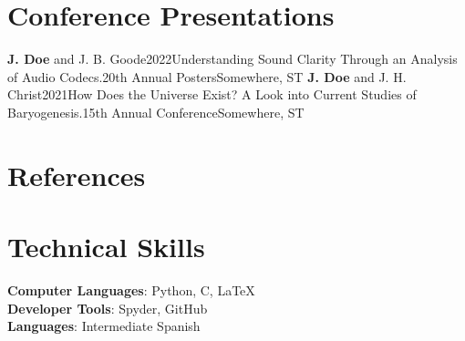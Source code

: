 \documentclass[letterpaper,11pt]{article}
\begin{document}

\section{Conference Presentations}
    \cvSubHeadingListStart
        \cvPosterItem
            {\textbf{J. Doe} and J. B. Goode}{2022}{Understanding Sound Clarity Through an Analysis of Audio Codecs.}{20th Annual Posters}{Somewhere, ST}
        \cvPosterItem
            {\textbf{J. Doe} and J. H. Christ}{2021}{How Does the Universe Exist? A Look into Current Studies of Baryogenesis.}{15th Annual Conference}{Somewhere, ST}
    \cvSubHeadingListEnd


\section{References}
    \cvSubHeadingListStart
        

    \cvSubHeadingListEnd


\section{Technical Skills}
 \begin{itemize}[leftmargin=0.15in, label={}]
    \small{\item{
     \textbf{Computer Languages}{: Python, C\Plus\Plus, LaTeX} \\
     \textbf{Developer Tools}{: Spyder, GitHub} \\
     \textbf{Languages}{: Intermediate Spanish}
    }}
 \end{itemize}


\end{document}
